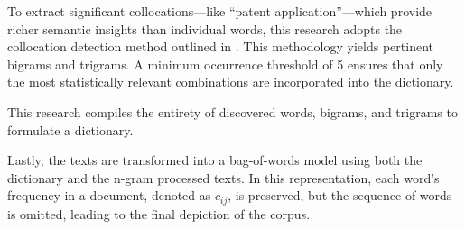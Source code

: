 \documentclass[12pt, letterpaper]{article}
\begin{document}
To extract significant collocations---like ``patent application''---which provide richer semantic insights than individual words, this research adopts the collocation detection method outlined in \cite{Mikolov2013-be}. This methodology yields pertinent bigrams and trigrams. A minimum occurrence threshold of 5 ensures that only the most statistically relevant combinations are incorporated into the dictionary.

This research compiles the entirety of discovered words, bigrams, and trigrams to formulate a dictionary. 

Lastly, the texts are transformed into a bag-of-words model using both the dictionary and the n-gram processed texts. In this representation, each word's frequency in a document, denoted as \(c_{ij}\), is preserved, but the sequence of words is omitted, leading to the final depiction of the corpus.
\end{document}
